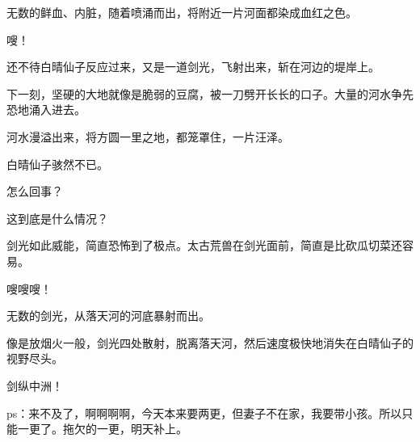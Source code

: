 \begin{this_body}
无数的鲜血、内脏，随着喷涌而出，将附近一片河面都染成血红之色。

嗖！

还不待白晴仙子反应过来，又是一道剑光，飞射出来，斩在河边的堤岸上。

下一刻，坚硬的大地就像是脆弱的豆腐，被一刀劈开长长的口子。大量的河水争先恐地涌入进去。

河水漫溢出来，将方圆一里之地，都笼罩住，一片汪泽。

白晴仙子骇然不已。

怎么回事？

这到底是什么情况？

剑光如此威能，简直恐怖到了极点。太古荒兽在剑光面前，简直是比砍瓜切菜还容易。

嗖嗖嗖！

无数的剑光，从落天河的河底暴射而出。

像是放烟火一般，剑光四处散射，脱离落天河，然后速度极快地消失在白晴仙子的视野尽头。

剑纵中洲！

ps：来不及了，啊啊啊啊，今天本来要两更，但妻子不在家，我要带小孩。所以只能一更了。拖欠的一更，明天补上。

\end{this_body}

